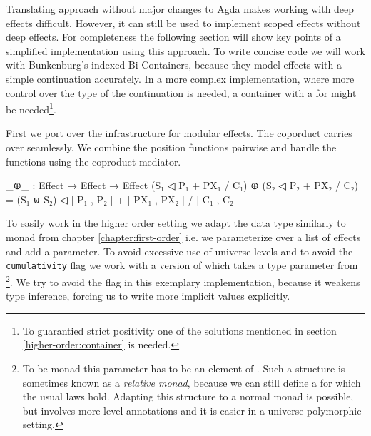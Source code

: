 Translating \textcite{DBLP:conf/haskell/WuSH14} approach without major changes
to Agda makes working  with deep effects difficult.
However, it can still be used to implement scoped effects without deep effects.
For completeness the following section will show key points of a simplified
implementation using this approach.
To write concise code we will work with Bunkenburg's indexed Bi-Containers,
because they model effects with a simple continuation accurately.
In a more complex implementation, where more control over the type of the
continuation is needed, a container with a  for 
might be needed\footnote{To guarantied strict positivity one of the solutions
  mentioned in section \ref{higher-order:container} is needed.}.

First we port over the infrastructure for modular effects.
The coporduct carries over seamlessly.
We combine the position functions pairwise and handle the 
functions using the coproduct mediator.

\begin{code}
_⊕_ : Effect → Effect → Effect
(S₁ ◁ P₁ + PX₁ / C₁) ⊕ (S₂ ◁ P₂ + PX₂ / C₂) =
  (S₁ ⊎ S₂) ◁ [ P₁ , P₂ ] + [ PX₁ , PX₂ ] / [ C₁ , C₂ ]
\end{code}
To easily work in the higher order setting we adapt the 
data type similarly to  monad from chapter
\ref{chapter:first-order} i.e. we parameterize over a list of effects and add a
 parameter.
To avoid excessive use of universe levels and to avoid the \texttt{--cumulativity}
flag we work with a version of  which takes a type parameter
from \footnote{To be monad this parameter has to be an element
  of . Such a structure is sometimes known as a \textit{relative
  monad}, because we can still define a \AgdaFunction{>>=} for which the usual
  laws hold. Adapting this structure to a normal monad is possible, but involves
  more level annotations and it is easier in a universe polymorphic setting.}.
We try to avoid the flag in this exemplary implementation, because it weakens
type inference, forcing us to write more implicit values explicitly.


